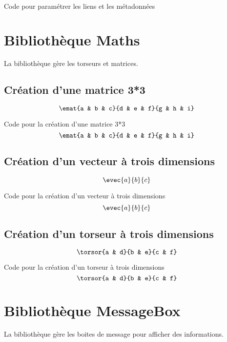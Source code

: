 {\begin{Latex}{Code pour paramétrer les liens et les métadonnées}
\end{Latex}


\chapter{Bibliothèque Maths}

La bibliothèque  gère les torseurs et matrices.

\section{Création d'une matrice 3*3}

$$\emat{a & b & c}{d & e & f}{g & h & i}  $$
\vskip 0.5cm

\begin{Latex}{Code pour la création d'une matrice 3*3}
    $$\emat{a & b & c}{d & e & f}{g & h & i}  $$
\end{Latex}

\section{Création d'un vecteur à trois dimensions}

$$\evec{a}{b}{c}  $$
\vskip 0.5cm

\begin{Latex}{Code pour la création d'un vecteur à trois dimensions}
    $$\evec{a}{b}{c}  $$
\end{Latex}


\section{Création d'un torseur à trois dimensions}

$$\torsor{a & d}{b & e}{c & f}  $$
\vskip 0.5cm

\begin{Latex}{Code pour la création d'un torseur à trois dimensions}
    $$\torsor{a & d}{b & e}{c & f}  $$
\end{Latex}

\chapter{Bibliothèque MessageBox}

La bibliothèque  gère les boites de message pour afficher des informations.\\


}
